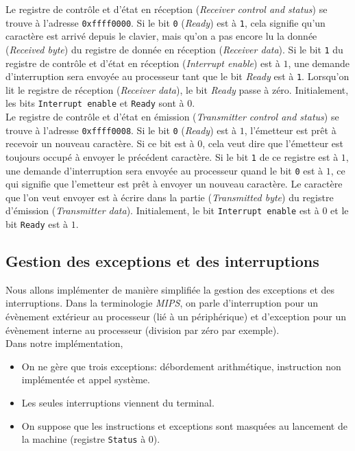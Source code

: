 \documentclass[12pt]{article}
\begin{document}
Le registre de contrôle et d'état en réception (\emph{Receiver control and status})
se trouve à l'adresse \verb+0xffff0000+. Si le bit \verb+0+ (\emph{Ready}) est à \verb+1+, cela signifie qu'un caractère est arrivé
depuis le clavier, mais qu'on a pas encore lu la donnée (\emph{Received byte}) du registre de donnée en réception (\emph{Receiver data}).
Si le bit \verb+1+ du registre de contrôle et d'état en réception (\emph{Interrupt enable}) est à $1$, une demande
d'interruption sera envoyée au processeur tant que le bit \emph{Ready} est à \verb+1+.
Lorsqu'on lit le registre de réception (\emph{Receiver data}), le bit \emph{Ready} passe à zéro. Initialement, les bits
\verb+Interrupt enable+ et \verb+Ready+ sont à $0$.\\

Le registre de contrôle et d'état en émission (\emph{Transmitter control and status}) se trouve à l'adresse \verb+0xffff0008+. Si le
bit \verb+0+ (\emph{Ready}) est à $1$, l'émetteur est prêt à recevoir un nouveau caractère. Si ce bit est à $0$, cela veut dire que l'émetteur
est toujours occupé à envoyer le précédent caractère. Si le bit \verb+1+ de ce registre est à $1$, une demande d'interruption sera envoyée au processeur
quand le bit \verb+0+ est à $1$, ce qui signifie que l'emetteur est prêt à envoyer un nouveau caractère. Le caractère que l'on veut envoyer est à écrire dans la
partie (\emph{Transmitted byte}) du registre d'émission (\emph{Transmitter data}). Initialement,
le bit \verb+Interrupt enable+ est à $0$ et le bit \verb+Ready+ est à $1$.\\

\subsection{Gestion des exceptions et des interruptions}

Nous allons implémenter de manière simplifiée la gestion des exceptions et des interruptions.
Dans la terminologie \emph{MIPS}, on parle d'interruption
pour un évènement extérieur au processeur (lié à un périphérique) et d'exception pour un évènement interne au processeur (division par zéro par exemple).\\

Dans notre implémentation,

\begin{itemize}

\item On ne gère que trois exceptions: débordement arithmétique, instruction non implémentée et appel système.

\item Les seules interruptions viennent du terminal.

\item On suppose que les instructions et exceptions sont masquées au lancement de la machine (registre \verb+Status+ à $0$).

\end{itemize}
\end{document}
